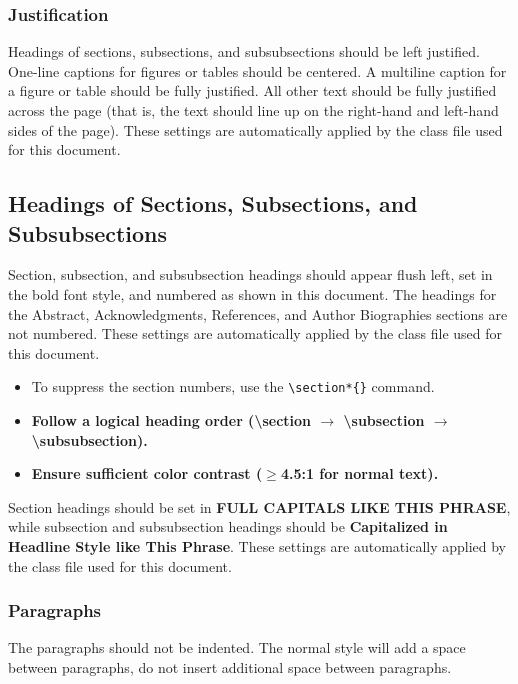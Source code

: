 \documentclass{scspaperproc}
\theoremstyle{scsthe}
\begin{document}
    \subsubsection{Justification}

    Headings of sections, subsections, and subsubsections should be left justified. One-line captions for figures or tables should be centered. A multiline caption for a figure or table should be fully justified. All other text should be fully justified across the page (that is, the text should line up on the right-hand and left-hand sides of the page). These settings are automatically applied by the class file used for this document.

    \subsection{Headings of Sections, Subsections, and Subsubsections}

    Section, subsection, and subsubsection headings should appear flush left, set in the bold font style, and numbered as shown in this document. The headings for the Abstract, Acknowledgments, References, and Author Biographies sections are not numbered. These settings are automatically applied by the class file used for this document.
    \begin{itemize}
        \item To suppress the section numbers, use the \verb+\section*{}+ command.
        \item \textbf{Follow a logical heading order (\textbackslash section $\rightarrow$ \textbackslash subsection $\rightarrow$ \textbackslash subsubsection).}
        \item \textbf{Ensure sufficient color contrast ($\ge$4.5:1 for normal text).}

    \end{itemize}

    Section headings should be set in \textbf{\uppercase{full capitals like this phrase}}, while subsection and subsubsection headings should be \textbf{Capitalized
    in Headline Style like This Phrase}. These settings are automatically applied by the class file used for this document.

    \subsubsection{Paragraphs}
    The paragraphs should not be indented. The normal style will add a space between paragraphs, do not insert additional space between paragraphs.
\end{document}

